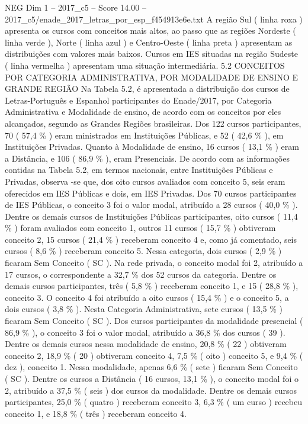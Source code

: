 \begin{textsample}{NEG Dim 1 – 2017\_c5 – Score 14.00 – 2017\_c5/enade\_2017\_letras\_por\_esp\_f454913e6e.txt}
A região Sul ( linha roxa ) apresenta os cursos com conceitos mais altos, ao passo que as regiões Nordeste ( linha verde ), Norte ( linha azul ) e Centro-Oeste ( linha preta ) apresentam as distribuições com valores mais baixos.
Cursos em IES situadas na região Sudeste ( linha vermelha ) apresentam uma situação intermediária. 5.2 CONCEITOS POR CATEGORIA ADMINISTRATIVA, POR MODALIDADE DE ENSINO E GRANDE REGIÃO Na Tabela 5.2, é apresentada a distribuição dos cursos de Letras-Português e Espanhol participantes do Enade/2017, por Categoria Administrativa e Modalidade de ensino, de acordo com os conceitos por eles alcançados, segundo as Grandes Regiões brasileiras.
Dos 122 cursos participantes, 70 ( 57,4 \% ) eram ministrados em Instituições Públicas, e 52 ( 42,6 \% ), em Instituições Privadas.
Quanto à Modalidade de ensino, 16 cursos ( 13,1 \% ) eram a Distância, e 106 ( 86,9 \% ), eram Presenciais.
De acordo com as informações contidas na Tabela 5.2, em termos nacionais, entre Instituições Públicas e Privadas, observa -se que, dos oito cursos avaliados com conceito 5, seis eram oferecidos em IES Públicas e dois, em IES Privadas.
Dos 70 cursos participantes de IES Públicas, o conceito 3 foi o valor modal, atribuído a 28 cursos ( 40,0 \% ).
Dentre os demais cursos de Instituições Públicas participantes, oito cursos ( 11,4 \% ) foram avaliados com conceito 1, outros 11 cursos ( 15,7 \% ) obtiveram conceito 2, 15 cursos ( 21,4 \% ) receberam conceito 4 e, como já comentado, seis cursos ( 8,6 \% ) receberam conceito 5.
Nessa categoria, dois cursos ( 2,9 \% ) ficaram Sem Conceito ( SC ).
Na rede privada, o conceito modal foi 2, atribuído a 17 cursos, o correspondente a 32,7 \% dos 52 cursos da categoria.
Dentre os demais cursos participantes, três ( 5,8 \% ) receberam conceito 1, e 15 ( 28,8 \% ), conceito 3.
O conceito 4 foi atribuído a oito cursos ( 15,4 \% ) e o conceito 5, a dois cursos ( 3,8 \% ).
Nesta Categoria Administrativa, sete cursos ( 13,5 \% ) ficaram Sem Conceito ( SC ).
Dos cursos participantes da modalidade presencial ( 86,9 \% ), o conceito 3 foi o valor modal, atribuído a 36,8 \% dos cursos ( 39 ).
Dentre os demais cursos nessa modalidade de ensino, 20,8 \% ( 22 ) obtiveram conceito 2, 18,9 \% ( 20 ) obtiveram conceito 4, 7,5 \% ( oito ) conceito 5, e 9,4 \% ( dez ), conceito 1.
Nessa modalidade, apenas 6,6 \% ( sete ) ficaram Sem Conceito ( SC ).
Dentre os cursos a Distância ( 16 cursos, 13,1 \% ), o conceito modal foi o 2, atribuído a 37,5 \% ( seis ) dos cursos da modalidade.
Dentre os demais cursos participantes, 25,0 \% ( quatro ) receberam conceito 3, 6,3 \% ( um curso ) recebeu conceito 1, e 18,8 \% ( três ) receberam conceito 4.

\end{textsample}
